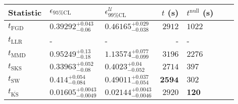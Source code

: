 \begin{tabular}{l|llr|llr}
	Statistic & $\epsilon_{95\%\mathrm{CL}}$ & $\epsilon^    {\mathcal{U}}_{99\%\mathrm{CL}}$ & $t$ (s) & $t^{\mathrm{null}}$ (s) \\
	\midrule
	$t_{\mathrm{FGD}}$ & $0.39292_{-0.06}^{+0.043}$ & $0.46165_{-0.038}^{+0.029}$ & $2912$ & $1022$ \\
	$t_{\mathrm{LLR}}$ & - & - & - & - \\
	$t_{\mathrm{MMD}}$ & $0.95249_{-0.18}^{+0.13}$ & $1.13574_{-0.099}^{+0.077}$ & $3196$ & $2276$ \\
	$t_{\mathrm{SKS}}$ & $0.33963_{-0.08}^{+0.052}$ & $0.4023_{-0.052}^{+0.04}$ & $2714$ & $397$ \\
	$t_{\mathrm{SW}}$ & $0.414_{-0.084}^{+0.054}$ & $0.49011_{-0.054}^{+0.037}$ & ${\mathbf{2594}}$ & $302$ \\
	$t_{\overline{\mathrm{KS}}}$ & ${\mathbf{0.01605_{-0.0049}^{+0.0043}}}$ & ${\mathbf{0.02144_{-0.0046}^{+0.0043}}}$ & $2920$ & ${\mathbf{120}}$ \\
	\bottomrule
\end{tabular}
